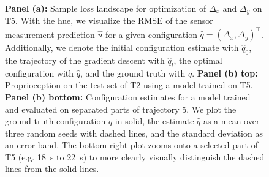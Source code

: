 \begin{figure}[hbt]
  \centering
  \\ %
  
  \caption{\textbf{Panel (a):} Sample loss landscape for optimization of $\Delta_x$ and $\Delta_y$ on T5. With the hue, we visualize the RMSE of the sensor measurement prediction $\hat{u}$ for a given configuration $\hat{q} = (\Delta_x, \Delta_y)^\top$. Additionally, we denote the initial configuration estimate with $\hat{q}_0$, the trajectory of the gradient descent with $\hat{q}_l$, the optimal configuration with $\hat{q}$, and the ground truth with $q$. \textbf{Panel (b) top:} Proprioception on the test set of T2 using a model trained on T5. \textbf{Panel (b) bottom:} Configuration estimates for a model trained and evaluated on separated parts of trajectory 5. We plot the ground-truth configuration $q$ in solid, the estimate $\hat{q}$ as a mean over three random seeds with dashed lines, and the standard deviation as an error band. The bottom right plot zooms onto a selected part of T5 (e.g. \SI{18}{s} to \SI{22}{s}) to more clearly visually distinguish the dashed lines from the solid lines.}
  \label{fig:promasens:results_trajectories}
\end{figure}

